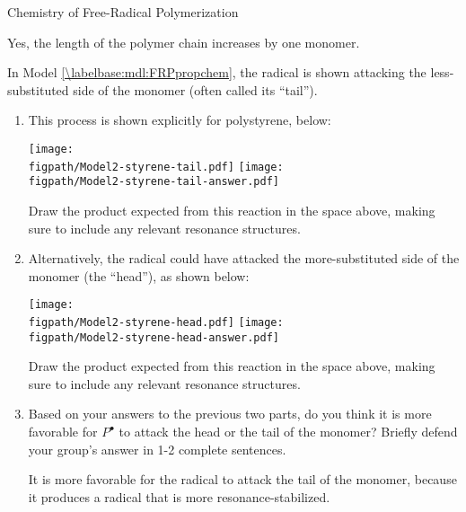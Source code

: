 \begin{activity}{Chemistry of Free-Radical Polymerization}
\begin{ctqs}
		\begin{solution}[1.2in]{}
			Yes, the length of the polymer chain increases by one monomer.
		\end{solution}
	
	\question In Model \ref{\labelbase:mdl:FRPpropchem}, the radical is shown attacking the less-substituted side of the monomer (often called its ``tail'').  
	
		\begin{enumerate}
			\item This process is shown explicitly for polystyrene, below:
	
			\begin{solution}[1.2in]{
				\texttt{[image: \\figpath/Model2-styrene-tail.pdf]}
				}
				\texttt{[image: \\figpath/Model2-styrene-tail-answer.pdf]}
			\end{solution}
			
				Draw the product expected from this reaction in the space above, making sure to include any relevant resonance structures.
				
				\vspace{12pt}
			\item Alternatively, the radical could have attacked the more-substituted side of the monomer (the ``head''), as shown below:
	
			\begin{solution}[1.2in]{
				\texttt{[image: \\figpath/Model2-styrene-head.pdf]}
				}
				\texttt{[image: \\figpath/Model2-styrene-head-answer.pdf]}
			\end{solution}
			
				Draw the product expected from this reaction in the space above, making sure to include any relevant resonance structures.
				
				\vspace{12pt}
			\item Based on your answers to the previous two parts, do you think it is more favorable for $P^\bullet$ to attack the head or the tail of the monomer?  Briefly defend your group's answer in 1-2 complete sentences.
				
				\begin{solution}[1.5in]{}
					It is more favorable for the radical to attack the tail of the monomer, because it produces a radical that is more resonance-stabilized.
				\end{solution}
		\end{enumerate}
		

\end{ctqs}
\end{activity}
